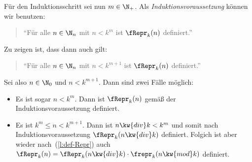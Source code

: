 Für den Induktionsschritt sei nun $m\in\N_+$.
%
Als \emph{Induktionsvoraussetzung} können wir benutzen:
\begin{quote}
  "`Für alle $n\in\N_n$ mit $n< k^m$ ist $\fRepr_k(n)$ definiert."'
\end{quote}
%
Zu zeigen ist, dass dann auch gilt:
\begin{quote}
  "`Für alle $n\in\N_n$ mit $n< k^{m+1}$ ist $\fRepr_k(n)$ definiert."'
\end{quote}
%
Sei also $n\in\N_0$ und $n< k^{m+1}$.
%
Dann sind zwei Fälle möglich:
\begin{itemize}
\item Es ist sogar $n< k^m$.
  Dann ist $\fRepr_k(n)$ gemäß der Induktionsvoraussetzung definiert.
\item Es ist $k^m\leq n< k^{m+1}$.
  Dann ist $n\kw{ div }k< k^m$
  und somit nach Induktionsvoraussetzung $\fRepr_k(n\kw{ div }k)$
  definiert.
  Folgich ist aber wieder nach~(\ref{l:def-Repr}) auch
  $\fRepr_k(n) =\fRepr_k(n \kw{ div } k) \cdot \frepr_k(n \kw{ mod }
  k)$ definiert.
\end{itemize}
% 
%
